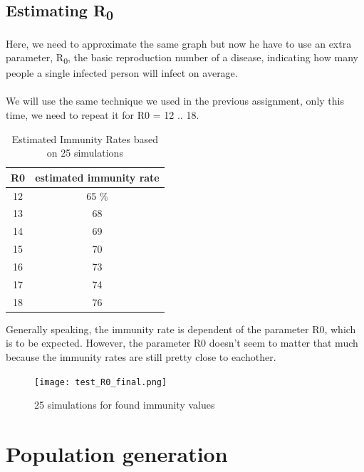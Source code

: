 \documentclass[runningheads]{llncs}
\begin{document}
	\subsection{Estimating R\textsubscript{0}}
	Here, we need to approximate the same graph but now he have to use an extra parameter, R\textsubscript{0}, the basic reproduction number of a disease, indicating how many people a single infected person will infect on average.
	\\
	\\
	\noindent
	We will use the same technique we used in the previous assignment, only this time, we need to repeat it for R0 = 12 .. 18.
	
	\begin{table}
		\begin{center}
			
			\begin{tabular}{c||c}
				R0 & estimated immunity rate \\ \hline
				12 & 65	\% \\
				13 & 68 \\
				14 & 69 \\
				15 & 70 \\
				16 & 73 \\
				17 & 74 \\
				18 & 76 \\
			\end{tabular}
			\caption{Estimated Immunity Rates based on 25 simulations}
		\end{center}
		
	\end{table}
	
	Generally speaking, the immunity rate is dependent of the parameter R0, which is to be expected. However, the parameter R0 doesn't seem to matter that much because the immunity rates are still pretty close to eachother.
	
	\begin{figure}
		\texttt{[image: test\_R0\_final.png]}
		\caption{25 simulations for found immunity values} 
	\end{figure}
	
	\newpage
	\noindent
	\section{Population generation}
	
\end{document}
